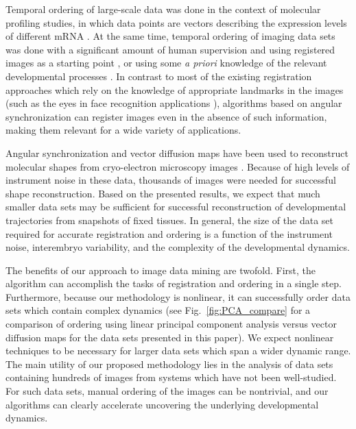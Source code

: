 \documentclass[twocolumn, 10pt]{article}
\newcommand{\fig}[0]{Fig.}
\begin{document}
%
%
%
Temporal ordering of large-scale data was done in the context of molecular profiling studies, in which data points are vectors describing the expression levels of different mRNA \citep{anavy2014blind, trapnell2014dynamics, gupta2008extracting}.
%
At the same time, temporal ordering of imaging data sets was done with a significant amount of human supervision and using registered images as a starting point \citep{yuan2014automated, surkova2008characterization, fowlkes2008quantitative}, or using some {\em a priori} knowledge of the relevant developmental processes \citep{dubuis2013accurate}.
%
%
In contrast to most of the existing registration approaches which rely on the knowledge of appropriate landmarks in the images \citep{ian1998statistical} (such as the eyes in face recognition applications \citep{zhao2003face}), algorithms based on angular synchronization can register images even in the absence of such information, making them relevant for a wide variety of applications.
%


Angular synchronization and vector diffusion maps have been used to reconstruct molecular shapes from cryo-electron microscopy images \citep{singer2012vector, zhao2014rotationally, singer2011viewing}.
%
Because of high levels of instrument noise in these data, thousands of images were needed for successful shape reconstruction.
%
Based on the presented results, we expect that much smaller data sets may be sufficient for successful reconstruction of developmental trajectories from snapshots of fixed tissues.
%
In general, the size of the data set required for accurate registration and ordering is a function of the instrument noise, interembryo variability, and the complexity of the developmental dynamics.

%
The benefits of our approach to image data mining are twofold.
%
First, the algorithm can accomplish the tasks of registration and ordering in a single step.
%
Furthermore, because our methodology is nonlinear, it can successfully order data sets which contain complex dynamics (see \fig~\ref{fig:PCA_compare} for a comparison of ordering using linear principal component analysis \citep{shlens2005tutorial} versus vector diffusion maps for the data sets presented in this paper).
%
We expect nonlinear techniques to be necessary for larger data sets which span a wider dynamic range.
%
The main utility of our proposed methodology lies in the analysis of data sets containing hundreds of images from systems which have not been well-studied.
%
For such data sets, manual ordering of the images can be nontrivial, and our algorithms can clearly accelerate uncovering the underlying developmental dynamics.
\end{document}
